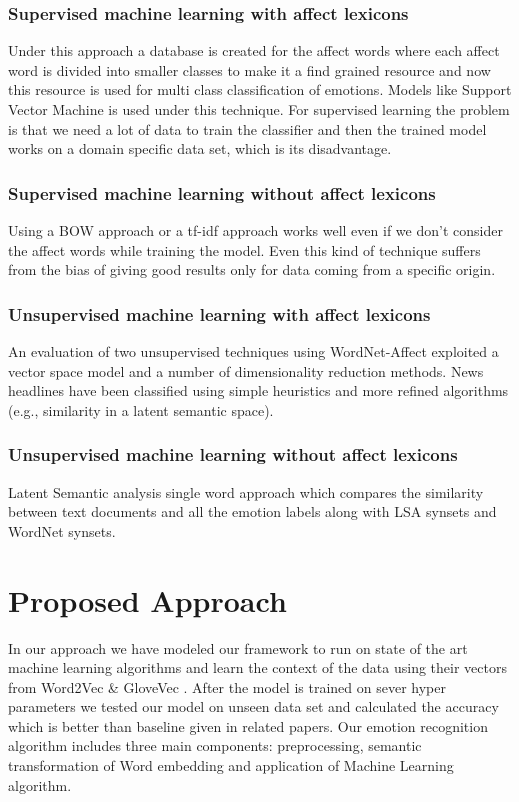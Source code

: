 \documentclass[conference]{IEEEtran}
\numberwithin{equation}{section}
\numberwithin{figure}{section}
\numberwithin{table}{section}
\begin{document}
\subsubsection{Supervised machine learning with affect lexicons}\label{sec:cap-num}
Under this approach a database is created for the affect words where each affect word is divided into smaller classes to make it a find grained resource and now this resource is used for multi class classification of emotions. Models like Support Vector Machine is used under this technique. For supervised learning the problem is that we need a lot of data to train the classifier and then the trained model works on a domain specific data set, which is its disadvantage.

\subsubsection{Supervised machine learning without affect lexicons}\label{sec:positioning}
Using a BOW approach or a tf-idf approach works well even if we don't consider the affect words while training the model. Even this kind of technique suffers from the bias of giving good results only for data coming from a specific origin.

\subsubsection{Unsupervised machine learning with affect lexicons}\label{sec:positioning}
An evaluation of two unsupervised techniques using WordNet-Affect exploited a vector space model and a number of dimensionality reduction methods. News headlines have been classified using simple heuristics and more refined algorithms (e.g., similarity in a latent semantic space).

\subsubsection{Unsupervised machine learning without affect lexicons}\label{sec:positioning} Latent Semantic analysis single word approach which compares the similarity between text documents and all the emotion labels along with LSA synsets and WordNet synsets.



\section{Proposed Approach}\label{sec:fig-tables}
In our approach we have modeled our framework to run on state of the art machine learning algorithms and learn the context of the data using their vectors from Word2Vec \cite{word2vec} \& GloveVec \cite{glove}. After the model is trained on sever hyper parameters we tested our model on unseen data set and calculated the accuracy which is better than baseline given in related papers. Our emotion recognition algorithm includes three main components: preprocessing, semantic transformation of Word embedding and application of Machine Learning algorithm. 
\end{document}
